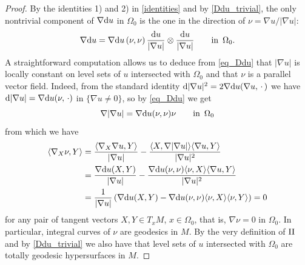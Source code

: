 \documentclass[10 pt,a4paper]{article}
\theoremstyle{definition}
\begin{document}
\begin{proof}
	By the identities 1) and 2) in \eqref{identities} and by \eqref{Ddu_trivial}, the only nontrivial component of $\nabla \mathrm{d} u$ in $\Omega_0$ is the one in the direction of $\nu = \nabla u/|\nabla u|$:
	\begin{equation}\label{eq_Ddu}
		\nabla \mathrm{d} u = \nabla \mathrm{d} u\left(\nu,\nu\right) \frac{\mathrm{d} u}{|\nabla u|} \otimes \frac{\mathrm{d} u}{|\nabla u|} \qquad \text{in } \, \Omega_0 .
	\end{equation}
	A straightforward computation allows us to deduce from \eqref{eq_Ddu} that $|\nabla u|$ is locally constant on level sets of $u$ intersected with $\Omega_0$ and that $\nu$ is a parallel vector field. Indeed, from the standard identity $\mathrm{d}|\nabla u|^2 = 2\nabla\mathrm{d} u(\nabla u,\,\cdot\,)$ we have $\mathrm{d}|\nabla u| = \nabla\mathrm{d} u(\nu,\,\cdot)$ in $\{\nabla u\neq 0\}$, so by \eqref{eq_Ddu} we get
	\[
		\nabla|\nabla u| = \nabla\mathrm{d} u(\nu,\nu) \nu \qquad \text{in } \, \Omega_0
	\]
	from which we have
	\begin{align*}
		\langle\nabla_X \nu,Y\rangle & = \frac{\langle\nabla_X \nabla u,Y\rangle}{|\nabla u|} - \frac{\langle X,\nabla|\nabla u|\rangle\langle\nabla u,Y\rangle}{|\nabla u|^2} \\
		& = \frac{\nabla\mathrm{d} u(X,Y)}{|\nabla u|} - \frac{\nabla\mathrm{d} u(\nu,\nu)\langle\nu, X\rangle\langle\nabla u,Y\rangle}{|\nabla u|^2} \\
		& = \frac{1}{|\nabla u|} \left(\nabla\mathrm{d} u(X,Y) - \nabla\mathrm{d} u(\nu,\nu)\langle\nu,X\rangle\langle\nu,Y\rangle\right) = 0
	\end{align*}
	for any pair of tangent vectors $X,Y\in T_x M$, $x\in\Omega_0$, that is, $\nabla\nu = 0$ in $\Omega_0$. In particular, integral curves of $\nu$ are geodesics in $M$. By the very definition of $\operatorname{II}$ and by \eqref{Ddu_trivial} we also have that level sets of $u$ intersected with $\Omega_0$ are totally geodesic hypersurfaces in $M$. 
	

\end{proof}
\end{document}
